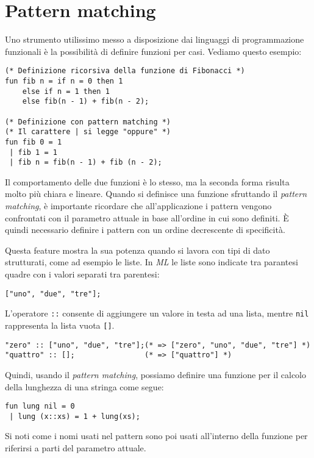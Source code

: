 \documentclass[12pt, a4paper]{report}
\theoremstyle{definition}
\newcommand{\code}[1]{\texttt{#1}}
\begin{document}
\section{Pattern matching}
Uno strumento utilissimo messo a disposizione dai linguaggi di programmazione
funzionali è la possibilità di definire funzioni per casi. Vediamo questo
esempio:
\begin{lstlisting}
(* Definizione ricorsiva della funzione di Fibonacci *)
fun fib n = if n = 0 then 1
    else if n = 1 then 1
    else fib(n - 1) + fib(n - 2);

(* Definizione con pattern matching *)
(* Il carattere | si legge "oppure" *)
fun fib 0 = 1
 | fib 1 = 1
 | fib n = fib(n - 1) + fib (n - 2);
\end{lstlisting}
Il comportamento delle due funzioni è lo stesso, ma la seconda forma risulta
molto più chiara e lineare. Quando si definisce una funzione sfruttando il
\emph{pattern matching}, è importante ricordare che all'applicazione i pattern
vengono confrontati con il parametro attuale in base all'ordine in cui sono
definiti. È quindi necessario definire i pattern con un ordine decrescente di
specificità.

Questa feature mostra la sua potenza quando si lavora con tipi di dato strutturati,
come ad esempio le liste. In \emph{ML} le liste sono indicate tra parantesi
quadre con i valori separati tra parentesi:
\begin{lstlisting}
["uno", "due", "tre"];
\end{lstlisting}
L'operatore \code{::} consente di aggiungere un valore in testa ad una lista,
mentre \code{nil} rappresenta la lista vuota \code{[]}.
\begin{lstlisting}
"zero" :: ["uno", "due", "tre"];(* => ["zero", "uno", "due", "tre"] *)
"quattro" :: [];                (* => ["quattro"] *)
\end{lstlisting}
Quindi, usando il \emph{pattern matching}, possiamo definire una funzione per
il calcolo della lunghezza di una stringa come segue:
\begin{lstlisting}
fun lung nil = 0
 | lung (x::xs) = 1 + lung(xs);
\end{lstlisting}
Si noti come i nomi usati nel pattern sono poi usati all'interno della funzione
per riferirsi a parti del parametro attuale.
\end{document}
